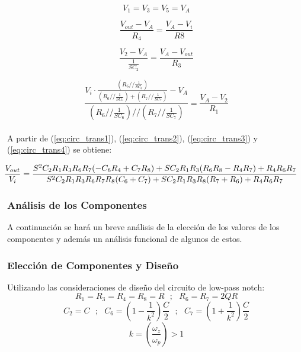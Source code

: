 \documentclass[a4paper]{article}
\begin{document}
\begin{equation}
V_1=V_3=V_5=V_A
\label{eq:circ_trans1}
\end{equation}

\begin{equation}
\frac{V_{out} - V_A}{R_4} = \frac{V_A-V_i}{R8}
\label{eq:circ_trans2}
\end{equation}

\begin{equation}
\frac{V_2 - V_A}{\frac{1}{SC_2}} = \frac{V_A-V_{out}}{R_3}
\label{eq:circ_trans3}
\end{equation}

\begin{equation}
\frac{V_i \cdot \frac{\left(R_6 // \frac{1}{SC_6}\right)}{\left(R_6 // \frac{1}{SC_6}\right) + \left(R_7 // \frac{1}{SC_7}\right)} - V_A}{\left(R_6 // \frac{1}{SC_6}\right) // \left(R_7 // \frac{1}{SC_7}\right)} = \frac{V_A-V_2}{R_1}
\label{eq:circ_trans4}
\end{equation} \\

A partir de (\ref{eq:circ_trans1}), (\ref{eq:circ_trans2}), (\ref{eq:circ_trans3}) y (\ref{eq:circ_trans4}) se obtiene:

\begin{equation}
\hspace{-0.5cm}
\frac{V_{out}}{V_i} = \frac{S^2 C_2 R_1 R_3 R_6 R_7 (-C_6 R_4 + C_7 R_8) + S C_2 R_1 R_3 (R_6 R_8 - R_4 R_7) + R_4 R_6 R_7}{S^2 C_2 R_1 R_3 R_6 R_7 R_8 (C_6 + C_7)+S C_2 R_1 R_3 R_8 (R_7 + R_6) + R_4 R_6 R_7}
\label{circ_trans}
\end{equation}

\subsubsection{Análisis de los Componentes}
	
A continuación se hará un breve análisis de la elección de los valores de los componentes y además un análisis funcional de algunos de estos.

\subsubsection{Elección de Componentes y Diseño}
\label{sec:eleccion_componentes}

Utilizando las consideraciones de diseño del circuito de low-pass notch:
$$R_1=R_3=R_4=R_8=R \ \ \ ; \ \ \ R_6=R_7=2QR$$
$$C_2=C \ \ \ ; \ \ \ C_6=(1-\frac{1}{k^2})\frac{C}{2}  \ \ \ ; \ \ \ C_7=(1+\frac{1}{k^2})\frac{C}{2}$$
$$k=\left(\frac{\omega_z}{\omega_p} \right) > 1$$
\end{document}

